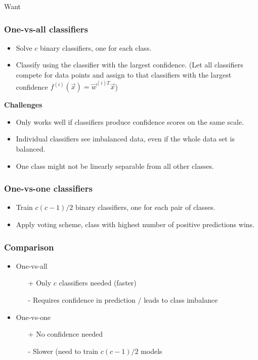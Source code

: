 \documentclass[8pt,a4paper]{scrartcl}
\begin{document}
\begin{multicols*}{3}

Want


\subsubsection{One-vs-all classifiers}

\begin{itemize}
\ncompaq
\item Solve $c$ binary classifiers, one for each class.
\item Classify using the classifier with the largest confidence. (Let all classifiers compete for data points and assign to that classifiers with the largest confidence $f^{(i)}(\vec{x})=\vec{w}^{(i)T}\vec{x}$)
\end{itemize}

\textbf{Challenges}
\begin{itemize}
\ncompaq
\item Only works well if classifiers produce confidence scores on the same scale.
\item Individual classifiers see imbalanced data, even if the whole data set is balanced.
\item One class might not be linearly separable from all other classes.
\end{itemize}

\subsubsection{One-vs-one classifiers}

\begin{itemize}
\ncompaq
\item Train $c(c-1)/2$ binary classifiers, one for each pair of classes.
\item Apply voting scheme, class with highest number of positive predictions wins.
\end{itemize}

\subsubsection{Comparison}

\begin{itemize}
\ncompaq
\item One-vs-all
\begin{itemize}
\ncompaq
\item[+] Only $c$ classifiers needed (faster)
\item[-] Requires confidence in prediction / leads to class imbalance
\end{itemize}
\item One-vs-one
\begin{itemize}
\ncompaq
\item[+] No confidence needed
\item[-] Slower (need to train $c(c-1)/2$ models
\end{itemize}
\end{itemize}


\end{multicols*}
\end{document}
